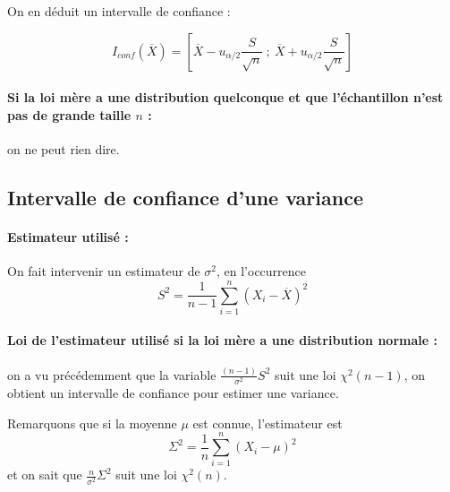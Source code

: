 On en déduit un intervalle de confiance :

$$I_{conf}(\overline{X})=\left[\overline{X}-u_{\alpha/2} \frac{S}{\sqrt{n}}~;~\overline{X} + u_{\alpha/2} \frac{S}{\sqrt{n}} \right]$$

\paragraph{Si la loi mère a une distribution quelconque et que l'échantillon n'est pas de grande taille $n$ :} on ne peut rien dire.



 \subsection{Intervalle de confiance d'une variance}
\paragraph{Estimateur utilisé :} On fait intervenir un estimateur de $\sigma^2$, en l'occurrence $$S^2=\frac{1}{n-1}\sum_{i=1}^n (X_i-\overline{X})^2$$

\paragraph{Loi de l'estimateur utilisé si la loi mère a une distribution normale :}  on a vu précédemment que la variable $\frac{(n-1)}{\sigma^2}S^2$ suit une loi $\chi^2(n-1)$, on obtient un intervalle de confiance pour estimer une variance. 

Remarquons que si la moyenne $\mu$ est connue, l'estimateur est 
$$\Sigma^2=\frac{1}{n}\sum_{i=1}^n (X_i-\mu)^2$$
et on sait que $\frac{n}{\sigma^2}\Sigma^2$ suit une loi $\chi^2(n)$.


